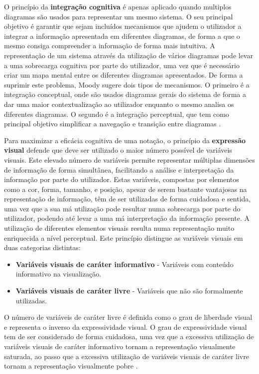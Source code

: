 O princípio da \textbf{integração cognitiva} é apenas aplicado quando multiplos diagramas são usados para representar um mesmo sistema. O seu principal objetivo é garantir que sejam incluídos mecanismos que ajudem o utilizador a integrar a informação apresentada em diferentes diagramas, de forma a que o mesmo consiga compreender a informação de forma mais intuitiva. A representação de um sistema através da utilização de vários diagramas pode levar a uma sobrecarga cognitiva por parte do utilizador, uma vez que é necessário criar um mapa mental entre os diferentes diagramas apresentados. De forma a suprimir este problema, Moody sugere dois tipos de mecanismos. O primeiro é a integração conceptual, onde são usados diagramas gerais do sistema de forma a dar uma maior contextualização ao utilizador enquanto o mesmo analisa os diferentes diagramas. O segundo é a integração perceptual, que tem como principal objetivo simplificar a navegação e transição entre diagramas \cite{moody2009physics}.

Para maximizar a eficácia cognitiva de uma notação, o princípio da \textbf{expressão visual} defende que deve ser utilizado o maior número possível de variáveis visuais. Este elevado número de variáveis permite representar múltiplas dimensões de informação de forma simultânea, facilitando a análise e interpretação da informação por parte do utilizador. Estas variáveis, compostas por elementos como a cor, forma, tamanho, e posição, apesar de serem bastante vantajosas na representação de informação, têm de ser utilizadas de forma cuidadosa e sentida, uma vez que a sua má utilização pode resultar numa sobrecarga por parte do utilizador, podendo até levar a uma má interpretação da informação presente. A utilização de diferentes elementos visuais resulta numa representação muito enriquecida a nível perceptual. Este princípio distingue as variáveis visuais em duas categorias distintas:

\begin{itemize}
  \item \textbf{Variáveis visuais de caráter informativo} - Variáveis com conteúdo informativo na visualização.
  \item \textbf{Variáveis visuais de caráter livre} - Variáveis que não são formalmente utilizadas.
\end{itemize}

O número de variáveis de caráter livre é definida como o grau de liberdade visual e representa o inverso da expressividade visual. O grau de expressividade visual tem de ser considerado de forma cuidadosa, uma vez que a excessiva utilização de variáveis visuais de caráter informativo tornam a representação visualmente saturada, ao passo que a excessiva utilização de variáveis visuais de caráter livre tornam a representação visualmente pobre \cite{moody2009physics}.

